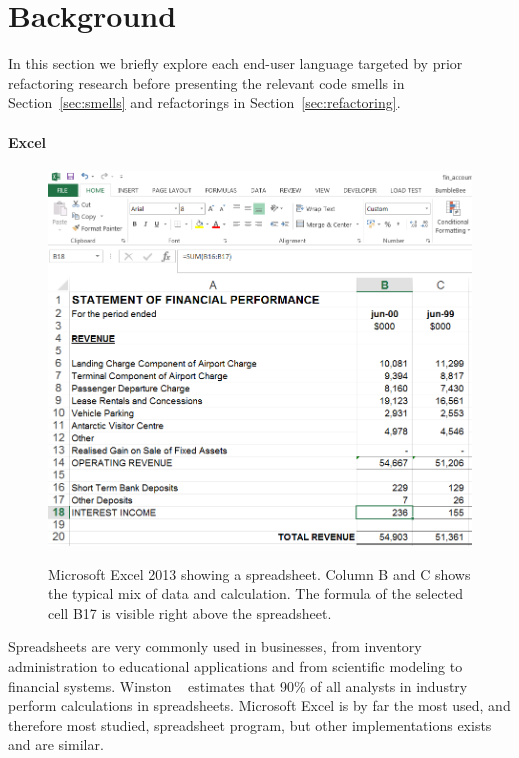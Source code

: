 \documentclass{sig-alternate}
\begin{document}
\section{Background}
\label{sec:background}

In this section we briefly explore each end-user language targeted by prior refactoring research  before presenting the relevant code smells in  Section~\ref{sec:smells} and refactorings in Section~\ref{sec:refactoring}.

\paragraph{Excel}

\begin{figure}
\caption{Microsoft Excel 2013 showing a spreadsheet. Column B and C shows the typical mix of data and calculation. The formula of the selected cell B17 is visible right above the spreadsheet.}
\centering
\includegraphics[width=\columnwidth]{img/excel-2}
\label{fig:spreadsheetexample}
\end{figure}

Spreadsheets are very commonly used in businesses, from inventory administration to educational applications and from scientific modeling to financial systems.
Winston ~\cite{Wins2001} estimates that 90\% of all analysts in industry perform calculations in spreadsheets. 
Microsoft Excel is by far the most used, and therefore most studied, spreadsheet program, but other implementations exists and are similar.
\end{document}
